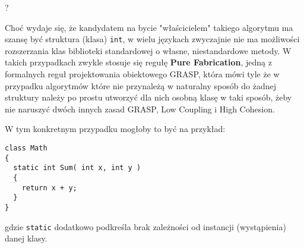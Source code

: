 ?

Choć wydaje się, że kandydatem na bycie "właścicielem" takiego algorytmu ma szansę być struktura (klasa) {\tt int},
w wielu językach zwyczajnie nie ma możliwości rozszerzania klas biblioteki standardowej o własne, niestandardowe metody.
W takich przypadkach zwykle stosuje się regułę {\bf Pure Fabrication}, jedną z formalnych reguł projektowania obiektowego 
GRASP, która mówi tyle że w przypadku algorytmów które nie przynależą w naturalny sposób do żadnej struktury należy
po prostu utworzyć dla nich osobną klasę w taki sposób, żeby nie naruszyć dwóch innych zasad GRASP, Low Coupling i 
High Cohesion. 

W tym konkretnym przypadku mogłoby to być na przykład:

\begin{scriptsize}
\begin{verbatim}
class Math
{
  static int Sum( int x, int y )
  {
    return x + y;
  }
}
\end{verbatim}
\end{scriptsize}

gdzie {\tt static} dodatkowo podkreśla brak zależności od instancji (wystąpienia) danej klasy.